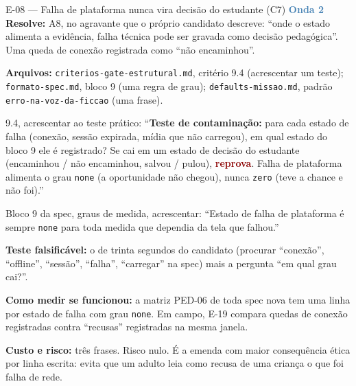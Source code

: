 \documentclass[11pt,a4paper]{article}
\newcommand{\rep}{\textcolor{DarkRed}{\textbf{reprova}}}
\newcommand{\onda}[1]{\textcolor{SteelBlue}{\textbf{Onda #1}}}
\begin{document}
\begin{emendabox}{E-08 --- Falha de plataforma nunca vira decisão do estudante (C7) \hfill \onda{2}}
\textbf{Resolve:} A8, no agravante que o próprio candidato descreve: ``onde o estado alimenta a
evidência, falha técnica pode ser gravada como decisão pedagógica''. Uma queda de conexão
registrada como ``não encaminhou''.

\textbf{Arquivos:} \texttt{criterios-gate-estrutural.md}, critério 9.4 (acrescentar um teste);
\texttt{formato-spec.md}, bloco 9 (uma regra de grau); \texttt{defaults-missao.md}, padrão
\texttt{erro-na-voz-da-ficcao} (uma frase).

\begin{depoisbox}\small
9.4, acrescentar ao teste prático: ``\textbf{Teste de contaminação:} para cada estado de falha
(conexão, sessão expirada, mídia que não carregou), em qual estado do bloco 9 ele é registrado?
Se cai em um estado de decisão do estudante (encaminhou / não encaminhou, salvou / pulou), \rep.
Falha de plataforma alimenta o grau \texttt{none} (a oportunidade não chegou), nunca
\texttt{zero} (teve a chance e não foi).''

Bloco 9 da spec, graus de medida, acrescentar: ``Estado de falha de plataforma é sempre
\texttt{none} para toda medida que dependia da tela que falhou.''
\end{depoisbox}

\textbf{Teste falsificável:} o de trinta segundos do candidato (procurar ``conexão'', ``offline'',
``sessão'', ``falha'', ``carregar'' na spec) mais a pergunta ``em qual grau cai?''.

\textbf{Como medir se funcionou:} a matriz PED-06 de toda spec nova tem uma linha por estado de
falha com grau \texttt{none}. Em campo, E-19 compara quedas de conexão registradas contra
``recusas'' registradas na mesma janela.

\textbf{Custo e risco:} três frases. Risco nulo. É a emenda com maior consequência ética por
linha escrita: evita que um adulto leia como recusa de uma criança o que foi falha de rede.
\end{emendabox}
\end{document}
